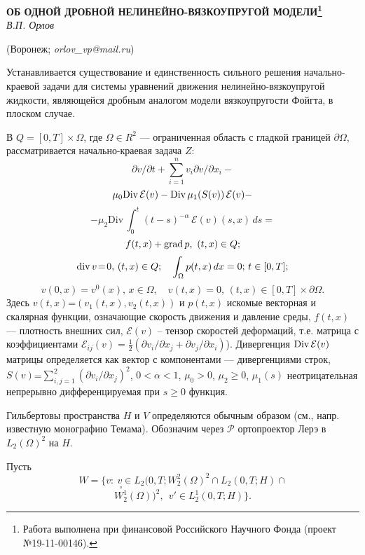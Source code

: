 \begin{center}
    {\bf ОБ ОДНОЙ ДРОБНОЙ НЕЛИНЕЙНО-ВЯЗКОУПРУГОЙ МОДЕЛИ\footnote{Работа выполнена при финансовой Российского Научного Фонда (проект №19-11-00146).}}\\

    {\it В.П. Орлов}

    (Воронеж; {\it orlov{\_}vp@mail.ru})
\end{center}


Устанавливается существование и единственность сильного решения на\-чаль\-но-краевой задачи для системы уравнений движения нелинейно-вяз\-ко\-упругой жидкости, являющейся дробным аналогом модели вязкоупругости Фойгта, в плоском случае.

В $Q=[0,T] \times \Omega$, где $ \Omega\in R^2$ --- ограниченная область с гладкой границей $\partial \Omega$, рассматривается началь\-но-крае\-вая за\-да\-ча $Z$:
$$
\partial v/\partial t + {\sum_{i=1}^n } v_i \partial v /\partial x_i -
$$
$$
 \mu_0 {\rm Div}\,\mathcal{E}(v) -{\rm Div}\,\mu_1(S(v))\,\mathcal{E}(v)-
$$
$$
-\mu_2\mathrm{Div}\,\int_{0}^t(t-s)^{-\alpha}\,\mathcal{E}(v)(s, x)\,ds =
$$
$$
f(t,x)+{\rm grad} \, p,\ (t,x) \in Q;
$$
$$
{\rm div}\,v \!=\!0,\, (t,x) \in Q; \quad \int_{\Omega} p(t,x)\, dx=0;\, t\in [0,T];
$$
$$
 v(0,x) = v^0 (x), \, x\in \Omega,\quad v(t,x)=0,\, (t,x)\in [0,T]\times \partial\Omega.
$$
Здесь $v(t,x)$=$ (v_1(t,x),v_2(t,x))$ и $p(t,x)$ искомые векто\-рная и скалярная
функции, означающие скорость движе\-ния и давление среды, $f(t,x)$ ---
плотность внешних сил, $\mathcal{E}(v)$ -- тензор
скоростей деформаций, т.е. матрица с коэффициентами $\mathcal{E}_{ij}(v)\! =\! \frac 1
2 (\partial v_i/\partial x_j +\partial v_j/\partial x_i )$).
Дивергенция ${\rm Div}\, \mathcal{E}(v)$ матрицы определяется как вектор с
компонентами --- дивергенциями строк, $S(v)$=$\sum_{i,j=1}^{2} (
\partial v_i/\partial x_j)^2$, $0<\alpha<1$, $\mu_0>0$, $\mu_2\ge 0$, $\mu_1(s)$ неотрицательная непрерывно
дифференцируемая при $s\ge 0$ функция.


 Гильбертовы пространства $H$ и $V$ определяются обычным образом
 (см., напр. известную монографию Темама).
Обозначим через $\mathcal{P}$ ортопроектор Лерэ в $L_2(\Omega)^2$ на $H$.

Пусть
$$
W\!=\{v:\ v\in L_2(0,T;W_2^2(\Omega)^2\cap L_2(0,T; H) \cap $$$$\stackrel{\circ}{W_2^1}(\Omega))^2,\ \ v'\in L_2^1(0,T;H)\}.
$$

